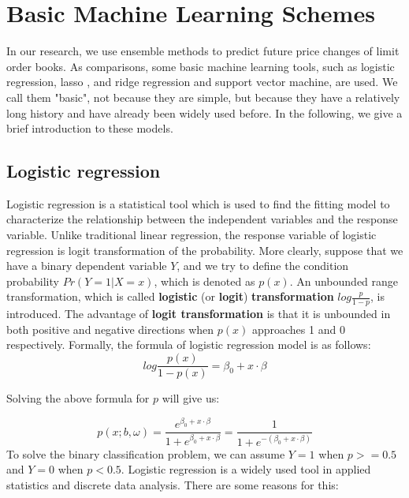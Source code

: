 \chapter{Basic Machine Learning Schemes}
In our research,  we use ensemble methods to predict future price changes of limit order books. As comparisons,  some basic machine learning tools, such as logistic regression,  lasso , and ridge regression and support vector machine,   are used. We call them "basic",  not because they are simple,  but because they have a relatively long history and have already been widely used before. In the following,  we give a brief introduction to these models.


\section{Logistic regression}
Logistic regression is a statistical tool which is used to find the fitting model to characterize the relationship between the independent variables and the response variable. Unlike traditional linear regression,  the response variable of logistic regression is logit transformation of the probability. More clearly,  suppose that we have a binary dependent variable $Y$,  and we try to define the condition probability $Pr(Y=1|X=x)$,  which is denoted as $p(x)$. An unbounded range transformation,  which is called \textbf{logistic} (or \textbf{logit}) \textbf{transformation} $log\frac{p}{1-p}$,  is introduced. The advantage of \textbf{logit transformation} is that it is unbounded in both positive and negative directions when $p(x)$ approaches 1 and 0 respectively. Formally,  the formula of logistic regression model is as follows: \\
\begin{equation}\label{eq: logit}
log\frac{p(x)}{1-p(x)}=\beta_0+x\cdot \beta
\end{equation}      

Solving the above formula for $p$ will give us: 


\begin{equation}\label{eq: logit_p}
p(x;b, \omega)=\frac{e^{\beta_0+x\cdot\beta}}{1+e^{\beta_0+x\cdot\beta}}=\frac{1}{1+e^{-(\beta_0+x\cdot\beta)}}
\end{equation}      
To solve the binary classification problem,  we can assume $Y=1$ when $p>=0.5$ and $Y=0$ when $p<0.5$. Logistic regression is a widely used tool in applied statistics and discrete data analysis. There are some reasons for this: 

